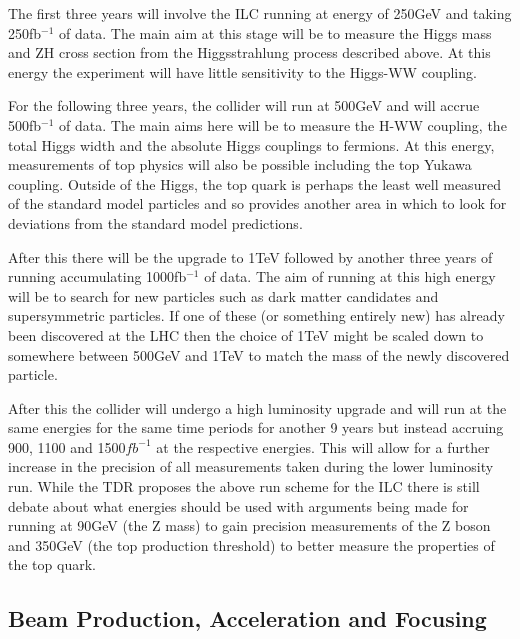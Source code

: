 The first three years will involve the ILC running at energy of 250GeV and taking 250fb${^{-1}}$ of data. The main aim at this stage will be to measure the Higgs mass and ZH cross section from the Higgsstrahlung process described above. At this energy the experiment will have little sensitivity to the Higgs-WW coupling.

For the following three years, the collider will run at 500GeV and will accrue 500fb${^{-1}}$ of data. The main aims here will be to measure the H-WW coupling, the total Higgs width and the absolute Higgs couplings to fermions. At this energy, measurements of top physics will also be possible including the top Yukawa coupling. Outside of the Higgs, the top quark is perhaps the least well measured of the standard model particles and so provides another area in which to look for deviations from the standard model predictions.

After this there will be the upgrade to 1TeV followed by another three years of running accumulating 1000fb${^{-1}}$ of data. The aim of running at this high energy will be to search for new particles such as dark matter candidates and supersymmetric particles. If one of these (or something entirely new) has already been discovered at the \ac{LHC} then the choice of 1TeV might be scaled down to somewhere between 500GeV and 1TeV to match the mass of the newly discovered particle.

After this the collider will undergo a high luminosity upgrade and will run at the same energies for the same time periods for another 9 years but instead accruing 900, 1100 and 1500${fb^{-1}}$ at the respective energies. This will allow for a further increase in the precision of all measurements taken during the lower luminosity run.
While the \ac{TDR} proposes the above run scheme for the \ac{ILC} there is still debate about what energies should be used with arguments being made for running at 90GeV (the Z mass) to gain precision measurements of the Z boson and 350GeV (the top production threshold) to better measure the properties of the top quark.

\subsection{Beam Production, Acceleration and Focusing}
\label{ILC:BEAM}

